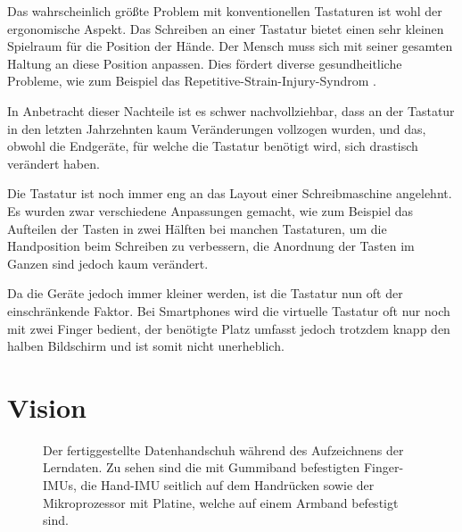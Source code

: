 Das wahrscheinlich größte Problem mit konventionellen Tastaturen ist wohl der ergonomische Aspekt. Das Schreiben an einer Tastatur bietet einen sehr kleinen Spielraum für die Position der Hände. Der Mensch muss sich mit seiner gesamten Haltung an diese Position anpassen. Dies fördert diverse gesundheitliche Probleme, wie zum Beispiel das Repetitive-Strain-Injury-Syndrom \citep{disorders}.

In Anbetracht dieser Nachteile ist es schwer nachvollziehbar, dass an der Tastatur in den letzten Jahrzehnten kaum Veränderungen vollzogen wurden, und das, obwohl die Endgeräte, für welche die Tastatur benötigt wird, sich drastisch verändert haben.

Die Tastatur ist noch immer eng an das Layout einer Schreibmaschine angelehnt. Es wurden zwar verschiedene Anpassungen gemacht, wie zum Beispiel das Aufteilen der Tasten in zwei Hälften bei manchen Tastaturen, um die Handposition beim Schreiben zu verbessern, die Anordnung der Tasten im Ganzen sind jedoch kaum verändert.

Da die Geräte jedoch immer kleiner werden, ist die Tastatur nun oft der einschränkende Faktor. Bei Smartphones wird die virtuelle Tastatur oft nur noch mit zwei Finger bedient, der benötigte Platz umfasst jedoch trotzdem knapp den halben Bildschirm und ist somit nicht unerheblich.

\section{Vision}

\begin{figure}
    \centering
    \caption[Datenhandschuh beim Aufzeichen der Lerndaten]{Der fertiggestellte Datenhandschuh während des Aufzeichnens der Lerndaten. Zu sehen sind die mit Gummiband befestigten Finger-IMUs, die Hand-IMU seitlich auf dem Handrücken sowie der Mikroprozessor mit Platine, welche auf einem Armband befestigt sind.}
\end{figure}

